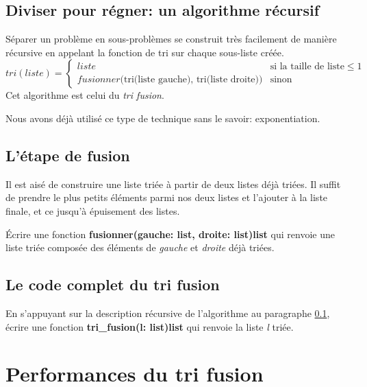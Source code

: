 \documentclass[a4paper,11pt]{article}
\begin{document}
\begin{Form}
\subsection{Diviser pour régner: un algorithme récursif}\label{algo}
Séparer un problème en sous-problèmes se construit très facilement de manière récursive en appelant la fonction de tri sur chaque sous-liste créée.
$$
tri(liste) = \left\{
    \begin{array}{ll}
        liste & \mbox{si la taille de liste} \leq 1 \\
        fusionner(\mbox{tri(liste gauche), tri(liste droite))} & \mbox{sinon }
    \end{array}
\right.
$$
Cet algorithme est celui du \emph{tri fusion}.
\begin{commentprof}
Nous avons déjà utilisé ce type de technique sans le savoir: exponentiation.
\end{commentprof}
\subsection{L'étape de fusion}
Il est aisé de construire une liste triée à partir de deux listes déjà triées. Il suffit de prendre le plus petits éléments parmi nos deux listes et l'ajouter à la liste finale, et ce jusqu'à épuisement des listes.
\begin{activite}
Écrire une fonction \textbf{fusionner(gauche: list, droite: list)\;\rightarrow\;list} qui renvoie une liste triée composée des éléments de \emph{gauche} et \emph{droite} déjà triées.
\end{activite}
\subsection{Le code complet du tri fusion}
\begin{activite}
En s'appuyant sur la description récursive de l'algorithme au paragraphe \ref{algo}, écrire une fonction \textbf{tri\_fusion(l: list)\;\rightarrow\;list} qui renvoie la liste \emph{l} triée.
\end{activite}
\section{Performances du tri fusion}

\end{Form}
\end{document}
